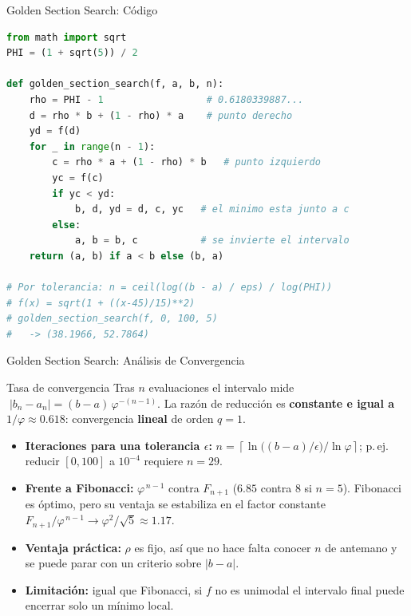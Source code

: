 \begin{frame}[fragile]{Golden Section Search: Código}
\begin{lstlisting}[language=Python]
from math import sqrt
PHI = (1 + sqrt(5)) / 2

def golden_section_search(f, a, b, n):
    rho = PHI - 1                  # 0.6180339887...
    d = rho * b + (1 - rho) * a    # punto derecho
    yd = f(d)
    for _ in range(n - 1):
        c = rho * a + (1 - rho) * b   # punto izquierdo
        yc = f(c)
        if yc < yd:
            b, d, yd = d, c, yc   # el minimo esta junto a c
        else:
            a, b = b, c           # se invierte el intervalo
    return (a, b) if a < b else (b, a)

# Por tolerancia: n = ceil(log((b - a) / eps) / log(PHI))
# f(x) = sqrt(1 + ((x-45)/15)**2)
# golden_section_search(f, 0, 100, 5)
#   -> (38.1966, 52.7864)
\end{lstlisting}
\end{frame}

\begin{frame}{Golden Section Search: Análisis de Convergencia}
    \begin{alertblock}{Tasa de convergencia}
        \small
        Tras $n$ evaluaciones el intervalo mide
        $\;|b_n-a_n| = (b-a)\,\varphi^{-(n-1)}$.
        La razón de reducción es \textbf{constante e igual a} $1/\varphi\approx 0.618$:
        convergencia \textbf{lineal} de orden $q=1$.
    \end{alertblock}

    \footnotesize
    \begin{itemize}
        \item \textbf{Iteraciones para una tolerancia $\epsilon$:}
              $n=\left\lceil \ln\!\big((b-a)/\epsilon\big)/\ln\varphi \right\rceil$;
              p.\,ej. reducir $[0,100]$ a $10^{-4}$ requiere $n=29$.
        \item \textbf{Frente a Fibonacci:} $\varphi^{\,n-1}$ contra $F_{n+1}$
              ($6.85$ contra $8$ si $n=5$). Fibonacci es óptimo, pero su ventaja se
              estabiliza en el factor constante
              $F_{n+1}/\varphi^{\,n-1}\to\varphi^{2}/\sqrt{5}\approx 1.17$.
        \item \textbf{Ventaja práctica:} $\rho$ es fijo, así que no hace falta conocer $n$
              de antemano y se puede parar con un criterio sobre $|b-a|$.
        \item \textbf{Limitación:} igual que Fibonacci, si $f$ no es unimodal el
              intervalo final puede encerrar solo un mínimo local.
    \end{itemize}
\end{frame}
